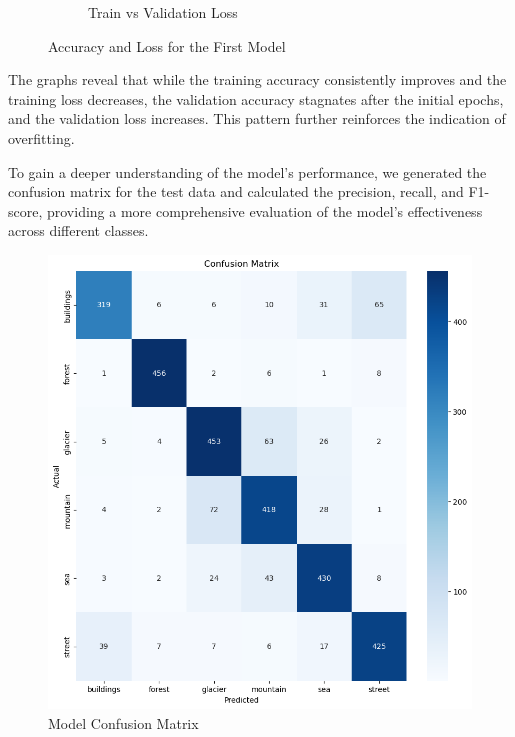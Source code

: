 \begin{figure}[h!]
\begin{subfigure}[t]{0.45\textwidth}
        \caption{Train vs Validation Loss}
        \label{fig:subfig2}
    \end{subfigure}
    \caption{Accuracy and Loss for the First Model}
    \label{fig:images}
\end{figure}

The graphs reveal that while the training accuracy consistently improves and the training loss decreases, the validation accuracy stagnates after the initial epochs, and the validation loss increases. This pattern further reinforces the indication of overfitting.

To gain a deeper understanding of the model's performance, we generated the confusion matrix for the test data and calculated the precision, recall, and F1-score, providing a more comprehensive evaluation of the model's effectiveness across different classes.

\begin{figure}[H]
    \centering
    \includegraphics[width=1\linewidth]{images/model_aulas_confusion.png}
    \caption{Model Confusion Matrix}
    \label{fig:enter-label}
\end{figure}

